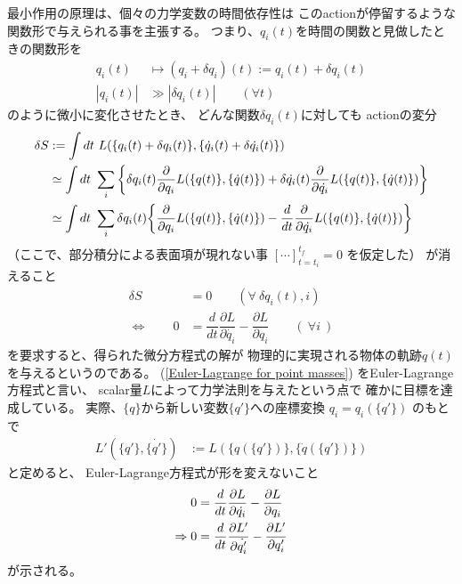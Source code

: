 最小作用の原理は、個々の力学変数の時間依存性は
このactionが停留するような関数形で与えられる事を主張する。
つまり、$q_i(t)$を時間の関数と見做したときの関数形を
\begin{align}
  q_i(t) &\mapsto (q_i+\delta q_i)(t) := q_i(t) + \delta q_i(t)
  \\
  | q_i(t) | & \gg | \delta q_i(t) |
  \qquad (\forall t)
\end{align}
のように微小に変化させたとき、
どんな関数$\delta q_i(t)$に対しても
actionの変分
\begin{align}
  \delta S &:= \int dt\ L(\{ q_i(t) + \delta q_i(t) \},
  \{ \dot{q}_i(t) + \delta \dot{q_i}(t) \} )
\notag\\&\simeq
  \int dt\ \sum_i
  \bigg\{
    \delta q_i(t)
    \dfrac{\partial}{\partial q_i}
    L(\{ q(t) \},
    \{ \dot{q}(t) \} )
+
    \delta \dot{q_i}(t)
    \dfrac{\partial}{\partial \dot{q_i}}
    L(\{ q(t) \},
    \{ \dot{q}(t) \} )
  \bigg\}
\notag\\&\simeq
\int dt\ \sum_i
\delta q_i(t)
\bigg\{
  \dfrac{\partial}{\partial q_i}
  L(\{ q(t) \},
  \{ \dot{q}(t) \} )
-
  \dfrac{d}{dt}
  \dfrac{\partial}{\partial \dot{q_i}}
  L(\{ q(t) \},
  \{ \dot{q}(t) \} )
\bigg\}
\end{align}
（ここで、部分積分による表面項が現れない事
$[\cdots]_{t=t_i}^{t_f}=0$
を仮定した）
が消えること
\begin{align}
  \delta S &= 0
  \qquad (\forall\ \delta q_i(t), i)
\\\Leftrightarrow\qquad
  0 &= 
  \dfrac{d}{dt}\dfrac{\partial L}{\partial \dot{q_i} }
  - \dfrac{\partial L}{\partial q_i }
  \qquad (\ \forall i\ )
\label{Euler-Lagrange for point masses}
\end{align}
を要求すると、得られた微分方程式の解が
物理的に実現される物体の軌跡${q(t)}$
を与えるというのである。
(\ref{Euler-Lagrange for point masses})
をEuler-Lagrange方程式と言い、
scalar量$L$によって力学法則を与えたという点で
確かに目標を達成している。
実際、$\{q\}$から新しい変数$\{ q'\}$への座標変換
$q_i = q_i(\{q'\})$
のもとで
\begin{align}
  L'(\{q'\}, \{\dot{q'}\}) &:= L(\{q(\{q'\})\}, \{\dot{q}(\{q'\})\})
\end{align}
と定めると、
Euler-Lagrange方程式が形を変えないこと
\begin{align}
  0 &= 
  \dfrac{d}{dt}\dfrac{\partial L}{\partial \dot{q_i} }
  - \dfrac{\partial L}{\partial q_i }
\notag\\\Rightarrow
0 &= 
\dfrac{d}{dt}\dfrac{\partial L'}{\partial \dot{q'_i} }
- \dfrac{\partial L'}{\partial q_i' }
\end{align}
が示される。

